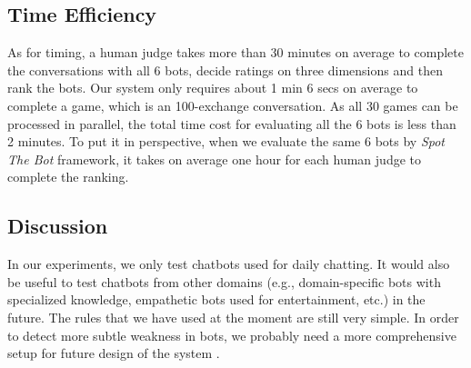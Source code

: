 \subsection{Time Efficiency}

As for timing, a human judge takes more than 30 minutes on average to complete 
the conversations with all 6 bots, decide ratings on three dimensions and then rank the bots. 
Our system only requires about 1 min 6 secs on average to 
complete a game, 
which is an 100-exchange conversation. As all 30 games can be processed in 
parallel, the total time cost for evaluating all the 6 bots is less than
2 minutes. To put it in perspective, when we evaluate the same
6 bots by \textit{Spot The Bot} framework, it takes on average one hour for
each human judge to complete the ranking.


\subsection{Discussion}
In our experiments, we only test chatbots used for daily chatting. 
It would also be useful to test chatbots from other domains 
(e.g., domain-specific bots with specialized knowledge, 
empathetic bots used for entertainment, etc.) in the future.
The rules that we have used at the moment are still very simple. 
In order to detect more subtle weakness in bots, we probably 
need a more comprehensive setup for future design of the system . 

